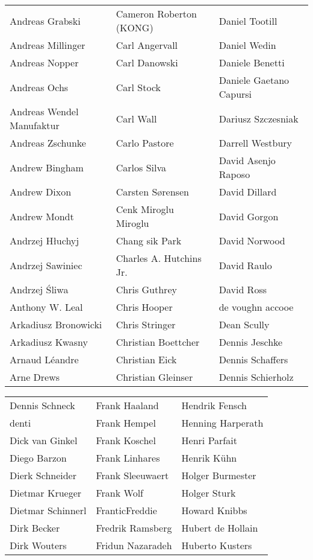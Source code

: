 \begin{small}
\begin{tabular}{p{4cm}p{4cm}p{4cm}}
Andreas Grabski & Cameron Roberton (KONG) & Daniel Tootill \\
Andreas Millinger & Carl Angervall & Daniel Wedin \\
Andreas Nopper & Carl Danowski & Daniele Benetti \\
Andreas Ochs & Carl Stock & Daniele Gaetano Capursi \\
Andreas Wendel Manufaktur & Carl Wall & Dariusz Szczesniak \\
Andreas Zschunke & Carlo Pastore & Darrell Westbury \\
Andrew Bingham & Carlos Silva & David Asenjo Raposo \\
Andrew Dixon & Carsten Sørensen & David Dillard \\
Andrew Mondt & Cenk Miroglu Miroglu & David Gorgon \\
Andrzej Hłuchyj & Chang sik Park & David Norwood \\
Andrzej Sawiniec & Charles A. Hutchins Jr. & David Raulo \\
Andrzej Śliwa & Chris Guthrey & David Ross \\
Anthony W. Leal & Chris Hooper & de voughn accooe \\
Arkadiusz Bronowicki & Chris Stringer & Dean Scully \\
Arkadiusz Kwasny & Christian Boettcher & Dennis Jeschke \\
Arnaud Léandre & Christian Eick & Dennis Schaffers \\
Arne Drews & Christian Gleinser & Dennis Schierholz \\
\end{tabular}
\newpage
\setlength{\tabcolsep}{1mm}
\begin{tabular}{p{4cm}p{4cm}p{4cm}}
Dennis Schneck & Frank Haaland & Hendrik Fensch \\
denti & Frank Hempel & Henning Harperath \\
Dick van Ginkel & Frank Koschel & Henri Parfait \\
Diego Barzon & Frank Linhares & Henrik Kühn \\
Dierk Schneider & Frank Sleeuwaert & Holger Burmester \\
Dietmar Krueger & Frank Wolf & Holger Sturk \\
Dietmar Schinnerl & FranticFreddie & Howard Knibbs \\
Dirk Becker & Fredrik Ramsberg & Hubert de Hollain \\
Dirk Wouters & Fridun Nazaradeh & Huberto Kusters \\

\end{tabular}
\end{small}
